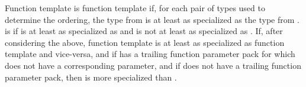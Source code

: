 \documentclass{wg21}
\begin{document}
\pnum
{}%
Function template 
is 
function template  if,
for each pair of types used to determine the ordering,
the type from 
is at least as specialized as
the type from .
is 
 if
is at least as specialized as
 and
is not at least as specialized as
.
\pnum
If, after considering the above, function template 
is at least as specialized as function template  and vice-versa, and
if  has a trailing function parameter pack
for which  does not have a corresponding parameter, and
if  does not have a trailing function parameter pack,
then  is more specialized than .
\end{document}
